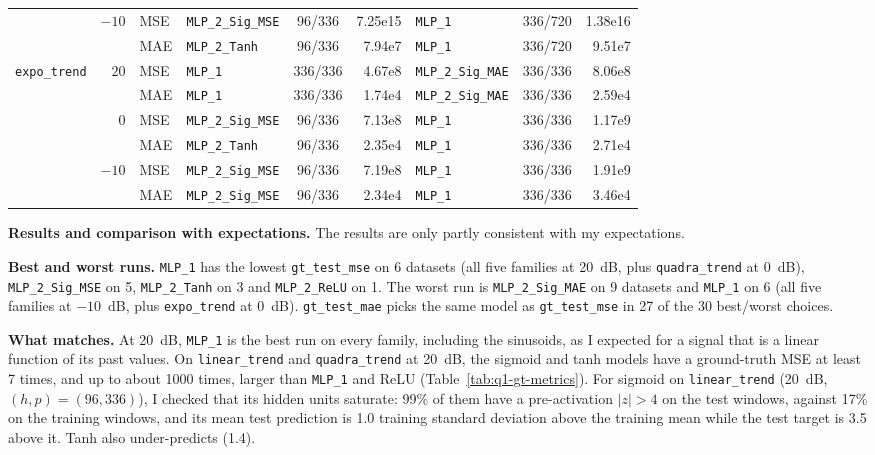 \documentclass[12pt]{article}
\theoremstyle{definition}
\begin{document}
{\begin{enumerate}[label=\textbf{1.2.\arabic*}, leftmargin=*]
{\begin{longtable}{@{}lrl@{\hspace{8pt}}lcr@{\hspace{8pt}}lcr@{}}
\addlinespace[2pt]
 & $-10$ & MSE & \texttt{MLP\_2\_Sig\_MSE} & 96/336 & 7.25e15 & \texttt{MLP\_1} & 336/720 & 1.38e16 \\
 &  & MAE & \texttt{MLP\_2\_Tanh} & 96/336 & 7.94e7 & \texttt{MLP\_1} & 336/720 & 9.51e7 \\
\midrule
\texttt{expo\_trend} & $20$ & MSE & \texttt{MLP\_1} & 336/336 & 4.67e8 & \texttt{MLP\_2\_Sig\_MAE} & 336/336 & 8.06e8 \\
 &  & MAE & \texttt{MLP\_1} & 336/336 & 1.74e4 & \texttt{MLP\_2\_Sig\_MAE} & 336/336 & 2.59e4 \\
\addlinespace[2pt]
 & $0$ & MSE & \texttt{MLP\_2\_Sig\_MSE} & 96/336 & 7.13e8 & \texttt{MLP\_1} & 336/336 & 1.17e9 \\
 &  & MAE & \texttt{MLP\_2\_Tanh} & 96/336 & 2.35e4 & \texttt{MLP\_1} & 336/336 & 2.71e4 \\
\addlinespace[2pt]
 & $-10$ & MSE & \texttt{MLP\_2\_Sig\_MSE} & 96/336 & 7.19e8 & \texttt{MLP\_1} & 336/336 & 1.91e9 \\
 &  & MAE & \texttt{MLP\_2\_Sig\_MSE} & 96/336 & 2.34e4 & \texttt{MLP\_1} & 336/336 & 3.46e4 \\
\end{longtable}
}

\textbf{Results and comparison with expectations.} The results are only partly consistent with my expectations.

\textbf{Best and worst runs.} \texttt{MLP\_1} has the lowest \texttt{gt\_test\_mse} on 6 datasets (all five families at 20~dB, plus \texttt{quadra\_trend} at 0~dB), \texttt{MLP\_2\_Sig\_MSE} on 5, \texttt{MLP\_2\_Tanh} on 3 and \texttt{MLP\_2\_ReLU} on 1. The worst run is \texttt{MLP\_2\_Sig\_MAE} on 9 datasets and \texttt{MLP\_1} on 6 (all five families at $-10$~dB, plus \texttt{expo\_trend} at 0~dB). \texttt{gt\_test\_mae} picks the same model as \texttt{gt\_test\_mse} in 27 of the 30 best/worst choices.

\textbf{What matches.} At 20~dB, \texttt{MLP\_1} is the best run on every family, including the sinusoids, as I expected for a signal that is a linear function of its past values. On \texttt{linear\_trend} and \texttt{quadra\_trend} at 20~dB, the sigmoid and tanh models have a ground-truth MSE at least 7 times, and up to about 1000 times, larger than \texttt{MLP\_1} and ReLU (Table~\ref{tab:q1-gt-metrics}). For sigmoid on \texttt{linear\_trend} (20~dB, $(h,p)=(96,336)$), I checked that its hidden units saturate: 99\% of them have a pre-activation $|z|>4$ on the test windows, against 17\% on the training windows, and its mean test prediction is 1.0 training standard deviation above the training mean while the test target is 3.5 above it. Tanh also under-predicts (1.4).


\end{enumerate}}
\end{document}
